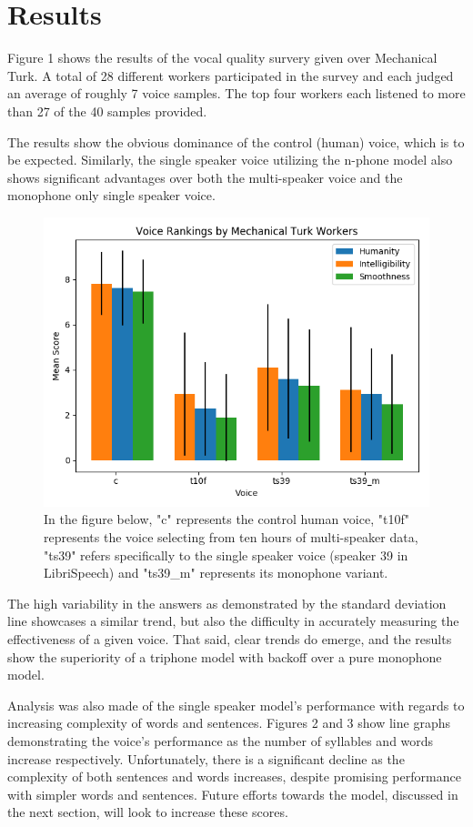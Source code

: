 \documentclass[10pt, journal, compsoc]{IEEEtran}
\begin{document}
\section{Results}
Figure 1 shows the results of the vocal quality survery given over Mechanical Turk. A total of 28 different workers participated in the survey and each judged an average of roughly 7 voice samples. The top four workers each listened to more than 27 of the 40 samples provided. \par
The results show the obvious dominance of the control (human) voice, which is to be expected. Similarly, the single speaker voice utilizing the n-phone model also shows significant advantages over both the multi-speaker voice and the monophone only single speaker voice.\par
\begin{figure}[h]
\caption{In the figure below, "c" represents the control human voice, "t10f" represents the voice selecting from ten hours of multi-speaker data, "ts39" refers specifically to the single speaker voice (speaker 39 in LibriSpeech) and "ts39\_m" represents its monophone variant.}
\centering
\includegraphics[scale=.5]{../experiments/results/all_voices_results.png}
\end{figure}
The high variability in the answers as demonstrated by the standard deviation line showcases a similar trend, but also the difficulty in accurately measuring the effectiveness of a given voice. That said, clear trends do emerge, and the results show the superiority of a triphone model with backoff over a pure monophone model.\par
Analysis was also made of the single speaker model's performance with regards to increasing complexity of words and sentences. Figures 2 and 3 show line graphs demonstrating the voice's performance as the number of syllables and words increase respectively. Unfortunately, there is a significant decline as the complexity of both sentences and words increases, despite promising performance with simpler words and sentences. Future efforts towards the model, discussed in the next section, will look to increase these scores.
\end{document}
